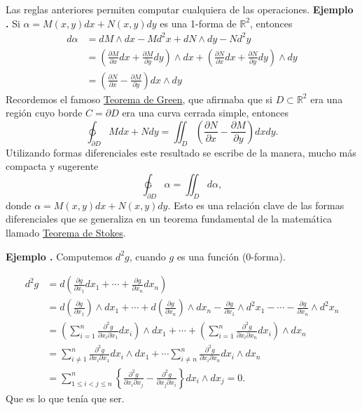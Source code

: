 \documentclass{article}
\newcommand{\rr}{\mathbb{R}}
\newcounter{ejemplo_cont}
\newenvironment{ejemplo}{\noindent\textbf{Ejemplo  \arabic{ejemplo_cont}.} }{\addtocounter{ejemplo_cont}{1}}
\begin{document}
Las reglas anteriores permiten computar cualquiera de las operaciones.
\begin{ejemplo} Si $\alpha=M(x,y)dx+N(x,y)dy$ es una 1-forma de $\rr^2$, entonces
\[ \begin{split}
    d\alpha&=dM\wedge dx-Md^2x + dN\wedge dy-Nd^2y\\
    &=\left(\frac{\partial M}{\partial x}dx+ \frac{\partial M}{\partial y}dy\right)\wedge dx+
    \left(\frac{\partial N}{\partial x}dx+ \frac{\partial N}{\partial y}dy\right)\wedge dy\\
    &= \left(\frac{\partial N}{\partial x}- \frac{\partial M}{\partial y}\right) dx\wedge dy
   \end{split}
\]
Recordemos el famoso \href{https://es.wikipedia.org/wiki/Teorema_de_Green}{Teorema de Green}, que afirmaba que si $D\subset \rr^2$ era una región cuyo borde $C=\partial D$ era una curva cerrada simple, entonces
\[\ointctrclockwise_{\partial D} Mdx +Ndy=\iint_D \left(\frac{\partial N}{\partial x}- \frac{\partial M}{\partial y}\right) dx dy.\]
Utilizando formas diferenciales este resultado se escribe de la manera, mucho más compacta y sugerente
\[\ointctrclockwise_{\partial D} \alpha = \iint_Dd\alpha,\]
donde $\alpha =M(x,y)dx+N(x,y)dy$.  Esto es una relación clave de las formas diferenciales que se generaliza en un teorema fundamental de la matemática llamado \href{https://es.wikipedia.org/wiki/Teorema_de_Stokes}{Teorema de Stokes}.
\end{ejemplo}




\begin{ejemplo} Computemos $d^2g$, cuando $g$ es una función (0-forma).

\[
\begin{split}
d^2g&=d\left(\frac{\partial g}{\partial x_1}dx_1+\cdots+\frac{\partial g}{\partial x_n}dx_n\right)\\
&= d\left(\frac{\partial g}{\partial x_1}\right)\wedge dx_1+\cdots+d\left(\frac{\partial g}{\partial x_n}\right)\wedge dx_n
    -\frac{\partial g}{\partial x_1}\wedge d^2x_1-\cdots-\frac{\partial g}{\partial x_n}\wedge d^2x_n\\
    &=\left(\sum_{i=1}^n\frac{\partial^2g}{\partial x_i\partial x_1} dx_i\right)\wedge dx_1+\cdots+\left(\sum_{i=1}^n\frac{\partial^2g}{\partial x_i\partial x_n} dx_i\right)\wedge dx_n\\
    &= \sum_{i\neq 1}^n\frac{\partial^2g}{\partial x_i\partial x_1} dx_i\wedge dx_1+\cdots
    \sum_{i\neq n}^n\frac{\partial^2g}{\partial x_i\partial x_n} dx_i\wedge dx_n\\
    &=\sum_{1\leq i<j\leq n}^n\left\{\frac{\partial^2g}{\partial x_i\partial x_j}- \frac{\partial^2g}{\partial x_j\partial x_i}\right \} dx_i\wedge dx_j=0.
\end{split}
\]
Que es lo que tenía que ser.


\end{ejemplo}
\end{document}

